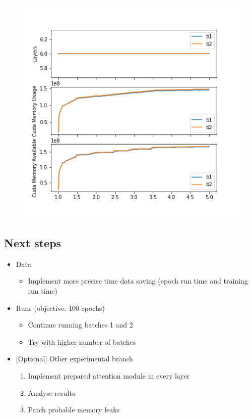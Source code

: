 \begin{figure}[H]
\includegraphics{parts/appendix/reports-gmsnn/docs_esteban-latex/test_reports/2018-06-15/2018_06_15_memory.png}
\end{figure}

\subsection{Next steps}

\begin{itemize}
\item
  Data

  \begin{itemize}
  \item
    Implement more precise time data saving (epoch run time and training
    run time)
  \end{itemize}
\item
  Runs (objective: 100 epochs)

  \begin{itemize}
  \item
    Continue running batches 1 and 2
  \item
    Try with higher number of batches
  \end{itemize}
\item
  {[}Optional{]} Other experimental branch

  \begin{enumerate}
  \def\labelenumi{\arabic{enumi}.}
  \item
    Implement prepared attention module in every layer
  \item
    Analyse results
  \item
    Patch probable memory leaks
  \end{enumerate}
\end{itemize}
